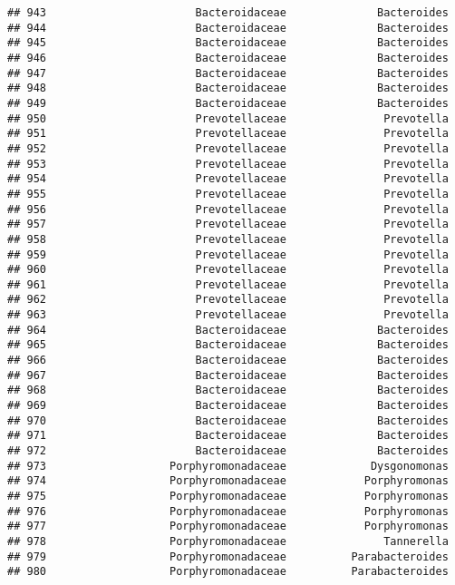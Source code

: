 \documentclass[
]{article}
\begin{document}
\begin{verbatim}
## 943                       Bacteroidaceae              Bacteroides
## 944                       Bacteroidaceae              Bacteroides
## 945                       Bacteroidaceae              Bacteroides
## 946                       Bacteroidaceae              Bacteroides
## 947                       Bacteroidaceae              Bacteroides
## 948                       Bacteroidaceae              Bacteroides
## 949                       Bacteroidaceae              Bacteroides
## 950                       Prevotellaceae               Prevotella
## 951                       Prevotellaceae               Prevotella
## 952                       Prevotellaceae               Prevotella
## 953                       Prevotellaceae               Prevotella
## 954                       Prevotellaceae               Prevotella
## 955                       Prevotellaceae               Prevotella
## 956                       Prevotellaceae               Prevotella
## 957                       Prevotellaceae               Prevotella
## 958                       Prevotellaceae               Prevotella
## 959                       Prevotellaceae               Prevotella
## 960                       Prevotellaceae               Prevotella
## 961                       Prevotellaceae               Prevotella
## 962                       Prevotellaceae               Prevotella
## 963                       Prevotellaceae               Prevotella
## 964                       Bacteroidaceae              Bacteroides
## 965                       Bacteroidaceae              Bacteroides
## 966                       Bacteroidaceae              Bacteroides
## 967                       Bacteroidaceae              Bacteroides
## 968                       Bacteroidaceae              Bacteroides
## 969                       Bacteroidaceae              Bacteroides
## 970                       Bacteroidaceae              Bacteroides
## 971                       Bacteroidaceae              Bacteroides
## 972                       Bacteroidaceae              Bacteroides
## 973                   Porphyromonadaceae             Dysgonomonas
## 974                   Porphyromonadaceae            Porphyromonas
## 975                   Porphyromonadaceae            Porphyromonas
## 976                   Porphyromonadaceae            Porphyromonas
## 977                   Porphyromonadaceae            Porphyromonas
## 978                   Porphyromonadaceae               Tannerella
## 979                   Porphyromonadaceae          Parabacteroides
## 980                   Porphyromonadaceae          Parabacteroides

\end{verbatim}
\end{document}

